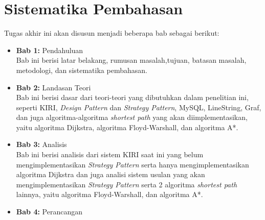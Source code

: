 \section{Sistematika Pembahasan}
\label{sec:sispem}
Tugas akhir ini akan disusun menjadi beberapa bab sebagai berikut:
\begin{itemize}
    \item \textbf{Bab 1:} Pendahuluan
    \\ Bab ini berisi latar belakang, rumusan masalah,tujuan, batasan masalah, metodologi, dan sistematika pembahasan.
    \item \textbf{Bab 2:} Landasan Teori
    \\ Bab ini berisi dasar dari teori-teori yang dibutuhkan dalam penelitian ini, seperti KIRI, \textit{Design Pattern} dan \textit{Strategy Pattern}, MySQL, LineString, Graf, dan juga algoritma-algoritma \textit{shortest path} yang akan diimplementasikan, yaitu algoritma Dijkstra, algoritma Floyd-Warshall, dan algoritma A*.
    \item \textbf{Bab 3:} Analisis
    \\ Bab ini berisi analisis dari sistem KIRI saat ini yang belum mengimplementasikan \textit{Strategy Pattern} serta hanya mengimplementasikan algoritma Dijkstra dan juga analisi sistem usulan yang akan mengimplementasikan \textit{Strategy Pattern} serta 2 algoritma \textit{shortest path} lainnya, yaitu algoritma Floyd-Warshall, dan algoritma A*. 
    \item \textbf{Bab 4:} Perancangan
        
\end{itemize}
